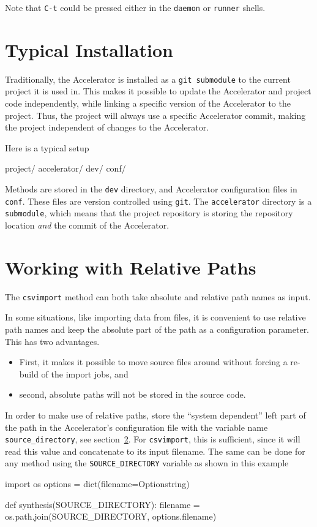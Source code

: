 Note that \texttt{C-t} could be pressed either in the \texttt{daemon}
or \texttt{runner} shells.



\clearpage

\section{Typical Installation}
Traditionally, the Accelerator is installed as a \texttt{git
submodule} to the current project it is used in.  This makes it
possible to update the Accelerator and project code independently,
while linking a specific version of the Accelerator to the project.
Thus, the project will always use a specific Accelerator commit,
making the project independent of changes to the Accelerator.

Here is a typical setup
\begin{shell}
project/
    accelerator/
    dev/
    conf/
\end{shell}
Methods are stored in the \texttt{dev} directory, and Accelerator
configuration files in \texttt{conf}.  These files are version
controlled using \texttt{git}.  The \texttt{accelerator} directory is
a \texttt{submodule}, which means that the project repository is
storing the repository location \textsl{and} the commit of the
Accelerator.


\clearpage

\section{Working with Relative Paths}

The \texttt{csvimport} method can both take absolute and relative path
names as input.


In some situations, like importing data from files, it is convenient
to use relative path names and keep the absolute part of the path as a
configuration parameter.  This has two advantages.
\begin{itemize}
\item[] First, it makes it possible to move source files around without
forcing a re-build of the import jobs, and
\item[] second, absolute paths will not be stored in the source code.
\end{itemize}
In order to make use of relative paths, store the ``system dependent''
left part of the path in the Accelerator's configuration file with the
variable name \texttt{source\_directory}, see section~\ref{}.
For \texttt{csvimport}, this is sufficient, since it will read this
value and concatenate to its input filename.  The same can be done for
any method using the \texttt{SOURCE\_DIRECTORY} variable as shown in
this example
\begin{python}
import os
options = dict(filename=Optionstring)

def synthesis(SOURCE_DIRECTORY):
    filename = os.path.join(SOURCE_DIRECTORY, options.filename)
\end{python}
